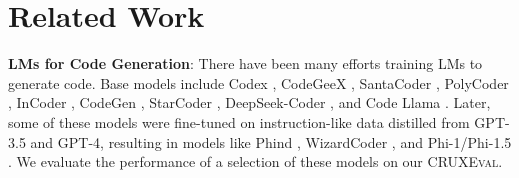 \documentclass{article}
\newcommand{\benchmark}{\textsc{CRUXEval}\xspace}
\newcommand{\benchmarki}{\textsc{CRUXEval-I}\xspace}
\newcommand{\benchmarko}{\textsc{CRUXEval-O}\xspace}
\begin{document}



\section{Related Work} \label{sec:related-work}

\noindent \textbf{LMs for Code Generation}: There have been many efforts training LMs to generate code. Base models include Codex \citep{chen2021evaluating}, CodeGeeX \citep{zheng2023codegeex}, SantaCoder \citep{allal2023santacoder}, PolyCoder \citep{xu2022systematic}, InCoder \citep{fried2022incoder}, CodeGen \citep{nijkamp2022codegen}, StarCoder \citep{li2023starcoder}, DeepSeek-Coder \citep{deepseek-coder}, and Code Llama \citep{roziere2023code}. Later, some of these models were fine-tuned on instruction-like data distilled from GPT-3.5 and GPT-4, resulting in models like Phind \citep{Phind}, WizardCoder \citep{luo2023wizardcoder}, and Phi-1/Phi-1.5 \citep{li2023textbooks, gunasekar2023textbooks}. We evaluate the performance of a selection of these models on our \benchmark.
\end{document}
